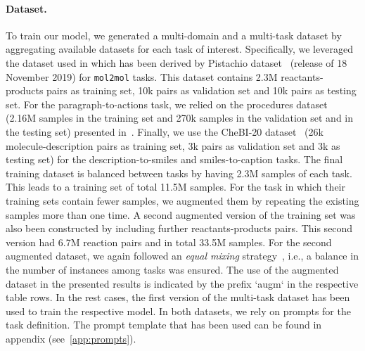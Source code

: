 \documentclass[nohyperref]{article}
\theoremstyle{plain}
\theoremstyle{definition}
\theoremstyle{remark}
\begin{document}
\paragraph{Dataset.}
To train our model, we generated a multi-domain and a multi-task dataset by aggregating available datasets for each task of interest. Specifically, we leveraged the dataset used in \citet{toniato2021unassisted} which has been derived by Pistachio dataset~\citep{pistachio} (release of 18 November 2019) for \texttt{mol2mol} tasks. This dataset contains 2.3M reactants-products pairs as training set, 10k pairs as validation set and 10k pairs as testing set. For the paragraph-to-actions task, we relied on the procedures dataset (2.16M samples in the training set and 270k samples in the validation set and in the testing set) presented in~\citeauthor{vaucher2020automated}. Finally, we use the CheBI-20 dataset~\citep{edwards2021text2mol,edwards2022translation} (26k molecule-description pairs as training set, 3k pairs as validation set and 3k as testing set) for the description-to-smiles and smiles-to-caption tasks. The final training dataset is balanced between tasks by having 2.3M samples of each task. This leads to a training set of total 11.5M samples. For the task in which their training sets contain fewer samples, we augmented them by repeating the existing samples more than one time. A second augmented version of the training set was also been constructed by including further reactants-products pairs. This second version had 6.7M reaction pairs and in total 33.5M samples. For the second augmented dataset, we again followed an \emph{equal mixing} strategy~\cite{raffel2020exploring}, i.e., a balance in the number of instances among tasks was ensured. The use of the augmented dataset in the presented results is indicated by the prefix `augm` in the respective table rows. In the rest cases, the first version of the multi-task dataset has been used to train the respective model. In both datasets, we rely on prompts for the task definition. The prompt template that has been used can be found in appendix (see~\autoref{app:prompts}).
\end{document}
